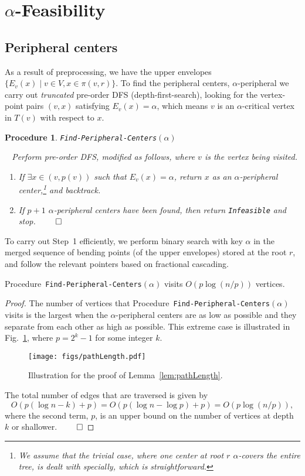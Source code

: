 \documentclass{llncs}
\newtheorem{procedure}{Procedure}
\newcommand{\QED}{\hfill$\qed$}
\begin{document}
{\section{$\alpha$-Feasibility}\label{sec:feasibility}

\subsection{Peripheral centers}\label{sec:Pctrs}
As a result of preprocessing,
we have the upper envelopes $\{E_v(x)\mid v\in V, x\in \pi(v,r)\}$.
To find the peripheral centers, $\alpha$-peripheral 
we carry out {\em truncated} pre-order DFS (depth-first-search),
looking for the vertex-point pairs $(v,x)$ satisfying $E_v(x) = \alpha$,
which means $v$ is an $\alpha$-critical vertex in $T(v)$ with respect to $x$.

\begin{procedure}{\tt Find-Peripheral-Centers}\label{proc:findPC}$(\alpha)$

~\noindent
Perform pre-order DFS, modified as follows,
where $v$ is the vertex being visited.
\begin{enumerate}
\item
If $\exists x\in (v,p(v))$ such that $E_v(x)= \alpha$,
return $x$ as an $\alpha$-peripheral center,\footnote{We assume that the trivial case,
where one center at root $r$ $\alpha$-covers the entire tree, is dealt with specially,
which is straightforward. 
}
and backtrack.
\item
If $p\!+\!1$ $\alpha$-peripheral centers have been found, then return {\tt Infeasible} and stop.
\QED
\end{enumerate}
\end{procedure}
To carry out Step~1 efficiently,
we perform binary search with key $\alpha$ in the merged sequence
of bending points (of the upper envelopes) stored at the root $r$,
and follow the relevant pointers based on fractional cascading.

\begin{lemma}\label{lem:pathLength}
Procedure~{\tt Find-Peripheral-Centers}$(\alpha)$ visits 
$O(p\log(n/p))$ vertices.
\end{lemma}
\begin{proof}
The number of vertices that Procedure~{\tt Find-Peripheral-Centers}$(\alpha)$
visits is the largest when the $\alpha$-peripheral centers are as low as possible
and they separate from each other as high as possible.
This extreme case is illustrated in Fig.~\ref{fig:pathLength},
where $p= 2^{k}-1$ for some integer $k$.
\begin{figure}[h]
\centering
\texttt{[image: figs/pathLength.pdf]}
\caption{Illustration for the proof of Lemma~\ref{lem:pathLength}.}
\label{fig:pathLength}
\end{figure}
The total number of edges that are traversed is given by
\[
O(p(\log n -k) +p) = O(p(\log n - \log p) +p) =O(p\log (n/p)),
\]
where the second term, $p$, is an upper bound on the number of vertices at depth $k$ or shallower.
\QED
\end{proof}

}
\end{document}
